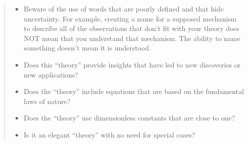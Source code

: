 \documentclass[letterpaper,10pt,english]{sphinxmanual}
\begin{document}
\begin{quote}
\begin{itemize}
\item {} 
Beware of the use of words that are poorly defined and that hide uncertainty. For example, creating a name for a supposed mechanism to describe all of the observations that don’t fit with your theory does NOT mean that you understand that mechanism. The ability to name something doesn’t mean it is understood.

\item {} 
Does this “theory” provide insights that have led to new discoveries or new applications?

\item {} 
Does the “theory” include equations that are based on the fundamental laws of nature?

\item {} 
Does the “theory” use dimensionless constants that are close to one?

\item {} 
Is it an elegant “theory” with no need for special cases?

\end{itemize}
\end{quote}
\end{document}

